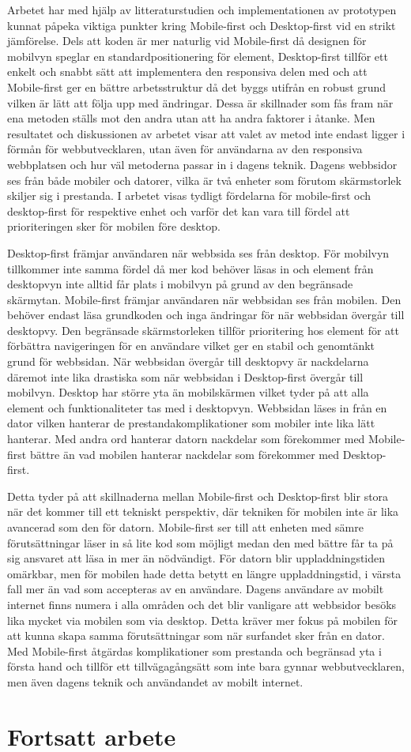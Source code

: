 \documentclass[11pt]{article}
\begin{document}
Arbetet har med hjälp av litteraturstudien och implementationen av prototypen kunnat påpeka viktiga punkter kring Mobile-first och Desktop-first vid en strikt jämförelse. Dels att koden är mer naturlig vid Mobile-first då designen för mobilvyn speglar en standardpositionering för element, Desktop-first tillför ett enkelt och snabbt sätt att implementera den responsiva delen med och att Mobile-first ger en bättre arbetsstruktur då det byggs utifrån en robust grund vilken är lätt att följa upp med ändringar. Dessa är skillnader som fås fram när ena metoden ställs mot den andra utan att ha andra faktorer i åtanke. Men resultatet och diskussionen av arbetet visar att valet av metod inte endast ligger i förmån för webbutvecklaren, utan även för användarna av den responsiva webbplatsen och hur väl metoderna passar in i dagens teknik. Dagens webbsidor ses från både mobiler och datorer, vilka är två enheter som förutom skärmstorlek skiljer sig i prestanda. I arbetet visas tydligt fördelarna för mobile-first och desktop-first för respektive enhet och varför det kan vara till fördel att prioriteringen sker för mobilen före desktop.

Desktop-first främjar användaren när webbsida ses från desktop. För mobilvyn tillkommer inte samma fördel då mer kod behöver läsas in och element från desktopvyn inte alltid får plats i mobilvyn på grund av den begränsade skärmytan. Mobile-first främjar användaren när webbsidan ses från mobilen. Den behöver endast läsa grundkoden och inga ändringar för när webbsidan övergår till desktopvy. Den begränsade skärmstorleken tillför prioritering hos element för att förbättra navigeringen för en användare vilket ger en stabil och genomtänkt grund för webbsidan. När webbsidan övergår till desktopvy är nackdelarna däremot inte lika drastiska som när webbsidan i Desktop-first övergår till mobilvyn. Desktop har större yta än mobilskärmen vilket tyder på att alla element och funktionaliteter tas med i desktopvyn. Webbsidan läses in från en dator vilken hanterar de prestandakomplikationer som mobiler inte lika lätt hanterar. Med andra ord hanterar datorn nackdelar som förekommer med Mobile-first bättre än vad mobilen hanterar nackdelar som förekommer med Desktop-first.

Detta tyder på att skillnaderna mellan Mobile-first och Desktop-first blir stora när det kommer till ett tekniskt perspektiv, där tekniken för mobilen inte är lika avancerad som den för datorn.  Mobile-first ser till att enheten med sämre förutsättningar läser in så lite kod som möjligt medan den med bättre får ta på sig ansvaret att läsa in mer än nödvändigt. För datorn blir uppladdningstiden omärkbar, men för mobilen hade detta betytt en längre uppladdningstid, i värsta fall mer än vad som accepteras av en användare. Dagens användare av mobilt internet finns numera i alla områden och det blir vanligare att webbsidor besöks lika mycket via mobilen som via desktop. Detta kräver mer fokus på mobilen för att kunna skapa samma förutsättningar som när surfandet sker från en dator. Med Mobile-first åtgärdas komplikationer som prestanda och begränsad yta i första hand och tillför ett tillvägagångsätt som inte bara gynnar webbutvecklaren, men även dagens teknik och användandet av mobilt internet.

\section{Fortsatt arbete}


\printbibliography
\end{document}
